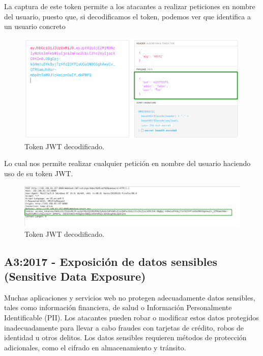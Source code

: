 La captura de este token permite a los atacantes a realizar peticiones en nombre del usuario, puesto que, 
si decodificamos el token, podemos ver que identifica a un usuario concreto

\begin{figure}[h!]  
    \includegraphics[width=\linewidth]{./imagenes/014_BrokenAuthentication_2.png}
    \caption{Token JWT decodificado.}  
    \label{fig:Token JWT decodificado}
\end{figure}

Lo cual nos permite realizar cualquier petición en nombre del usuario haciendo uso de su token JWT.

\begin{figure}[h!]  
    \includegraphics[width=\linewidth]{./imagenes/014_BrokenAuthentication_3.png}
    \caption{Token JWT decodificado.}  
    \label{fig:Broken Authentication attack}
\end{figure}

\subsection{A3:2017 - Exposición de datos sensibles (Sensitive Data Exposure)}

Muchas aplicaciones y servicios web no protegen adecuadamente datos sensibles, tales como
información financiera, de salud o Información Personalmente Identificable (PII). Los atacantes
pueden robar o modificar estos datos protegidos inadecuadamente para llevar a cabo fraudes
con tarjetas de crédito, robos de identidad u otros delitos. Los datos sensibles requieren métodos
de protección adicionales, como el cifrado en almacenamiento y tránsito. 

